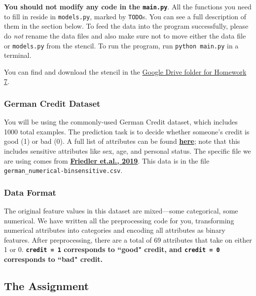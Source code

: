 \documentclass{article}
\begin{document}
\textbf{You should not modify any code in the \texttt{main.py}}. All the functions you need to fill in reside in \texttt{models.py}, marked by \texttt{TODO}s. You can see a full description of them in the section below. To feed the data into the program successfully, please do \textit{not} rename the data files and also make sure not to move either the data file or \texttt{models.py} from the stencil. To run the program, run \texttt{python main.py} in a terminal.\newline

You can find and download the stencil in the \href{https://drive.google.com/drive/folders/1L2hDZDggpbipDvfng0BQGTFkJgEsLPfM?usp=sharing}{Google Drive folder for Homework 7}. \newline


\subsubsection*{German Credit Dataset}

You will be using the commonly-used German Credit dataset, which includes 1000 total examples. The prediction task is to decide whether someone's credit is good (1) or bad (0). A full list of attributes can be found \href{https://archive.ics.uci.edu/ml/datasets/Statlog+\%28German+Credit+Data\%29}{\textbf{here}}; note that this includes sensitive attributes like sex, age, and personal status. The specific file we are using comes from \href{https://github.com/algofairness/fairness-comparison}{\textbf{Friedler et.al., 2019}}. 
This data is in the file \texttt{german\_numerical-binsensitive.csv}. 

\subsubsection*{Data Format}

The original feature values in this dataset are mixed---some categorical, some numerical. We have written all the preprocessing code for you, transforming numerical attributes into categories and encoding all attributes as binary features. After preprocessing, there are a total of 69 attributes that take on either 1 or 0. \textbf{\texttt{credit = 1} corresponds to ``good" credit, and \texttt{credit = 0} corresponds to ``bad" credit.}


\subsection*{The Assignment}
\end{document}
